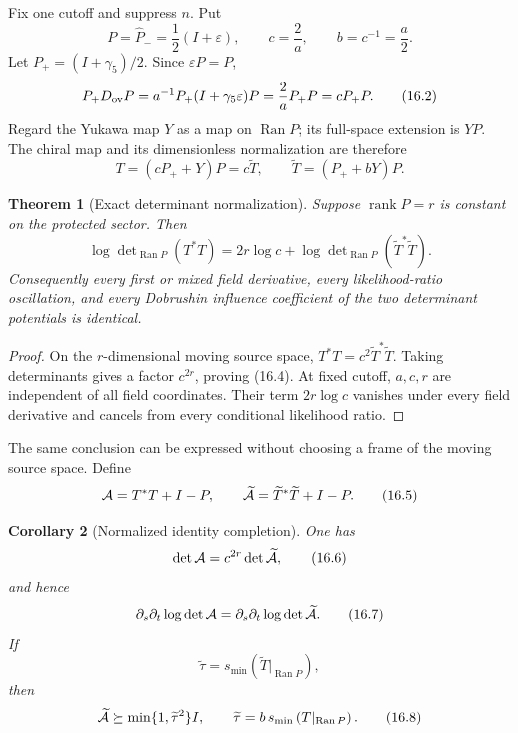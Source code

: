 \documentclass[11pt]{article}
\newtheorem{theorem}{Theorem}[section]
\newtheorem{corollary}[theorem]{Corollary}
\theoremstyle{remark}
\begin{document}
Fix one cutoff and suppress \(n\).  Put
\[
 P=\widehat P_-=\frac12(I+\varepsilon),\qquad
 c=\frac2a,\qquad b=c^{-1}=\frac a2.                        \tag{16.1}
\]
Let \(P_+=(I+\gamma_5)/2\).  Since \(\varepsilon P=P\),
\[
 P_+D_{\rm ov}P
 =a^{-1}P_+(I+\gamma_5\varepsilon)P
 =\frac2aP_+P=cP_+P.                                       \tag{16.2}
\]
Regard the Yukawa map \(Y\) as a map on \(\operatorname{Ran}P\);
its full-space extension is \(YP\).  The chiral map and its
dimensionless normalization are therefore
\[
 T=(cP_++Y)P=c\widetilde T,\qquad
 \widetilde T=(P_++bY)P.                                   \tag{16.3}
\]

\begin{theorem}[Exact determinant normalization]
\label{thm:v15v16-normalization}
Suppose \(\operatorname{rank}P=r\) is constant on the protected
sector.  Then
\[
 \boxed{
 \log\det\nolimits_{\operatorname{Ran}P}(T^*T)
 =
 2r\log c+
 \log\det\nolimits_{\operatorname{Ran}P}
       (\widetilde T^*\widetilde T).}                       \tag{16.4}
\]
Consequently every first or mixed field derivative, every
likelihood-ratio oscillation, and every Dobrushin influence
coefficient of the two determinant potentials is identical.
\end{theorem}

\begin{proof}
On the \(r\)-dimensional moving source space,
\(T^*T=c^2\widetilde T^*\widetilde T\).  Taking determinants gives
a factor \(c^{2r}\), proving (16.4).  At fixed cutoff, \(a,c,r\)
are independent of all field coordinates.  Their term
\(2r\log c\) vanishes under every field derivative and cancels from
every conditional likelihood ratio.
\end{proof}

The same conclusion can be expressed without choosing a frame of
the moving source space.  Define
\[
 {\cal A}=T^*T+I-P,\qquad
 \widetilde{\cal A}
 =\widetilde T^*\widetilde T+I-P.                           \tag{16.5}
\]

\begin{corollary}[Normalized identity completion]
\label{cor:v15v16-completion}
One has
\[
 \det{\cal A}=c^{2r}\det\widetilde{\cal A},                 \tag{16.6}
\]
and hence
\[
 \partial_s\partial_t\log\det{\cal A}
 =
 \partial_s\partial_t\log\det\widetilde{\cal A}.            \tag{16.7}
\]
If
\[
 \widetilde\tau=s_{\min}
 \left(\widetilde T|_{\operatorname{Ran}P}\right),
\]
then
\[
 \widetilde{\cal A}\succeq
 \min\{1,\widetilde\tau^2\}I,\qquad
 \widetilde\tau=b\,s_{\min}
 \left(T|_{\operatorname{Ran}P}\right).                    \tag{16.8}
\]
\end{corollary}
\end{document}
